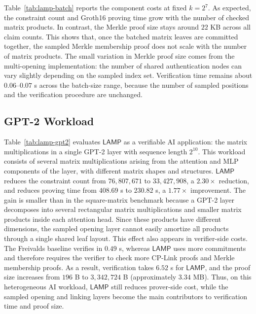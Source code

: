 \documentclass[conference,compsoc]{IEEEtran}
\newcommand{\protocol}{\textsf{LAMP}}   %
\theoremstyle{plain}
\theoremstyle{definition}
\theoremstyle{remark}
\providecommand{\DIFaddtex}[1]{{\protect\color{DIFADD} \sf #1}} %
\providecommand{\DIFaddbegin}{} %
\providecommand{\DIFaddend}{} %
\providecommand{\DIFadd}[1]{\texorpdfstring{\DIFaddtex{#1}}{#1}} %
\providecommand{\DIFaddincludegraphics}[2][]{{\color{blue}\fbox{\DIFOincludegraphics[#1]{#2}}}} %
\DeclareRobustCommand{\DIFaddbegin}{\DIFOaddbegin \let\includegraphics\DIFaddincludegraphics} %
\DeclareRobustCommand{\DIFaddend}{\DIFOaddend \let\includegraphics\DIFOincludegraphics} %
\begin{document}
Table~\ref{tab:lamp-batch} reports the component costs at fixed \(k=2^7\).
As expected, the constraint count and Groth16 proving time grow with the number
of checked matrix products.  In contrast, the Merkle proof size stays around
\(22\) KB across all claim counts.  This shows that, once the batched matrix
leaves are committed together, the sampled Merkle membership proof does not
scale with the number of matrix products.  The small variation in Merkle proof
size comes from the multi-opening implementation: the number of shared
authentication nodes can vary slightly depending on the sampled index set.
Verification time remains about \(0.06\)--\(0.07\) s across the batch-size
range, because the number of sampled positions and the verification procedure
are unchanged.

\subsection{GPT-2 Workload}
\label{sec:eval-gpt2}

Table~\ref{tab:lamp-gpt2} evaluates \(\protocol\) as a verifiable AI
application: the matrix multiplications in a single GPT-2 layer with sequence
length \(2^{10}\).  This workload consists of several matrix multiplications
arising from the attention and MLP components of the layer, with different
matrix shapes and structures.
\(\protocol\) reduces the constraint count from \(76{,}807{,}671\) to
\(33{,}427{,}908\), a \(2.30\times\) reduction, and reduces proving time from
\(408.69\) s to \(230.82\) s, a \(1.77\times\) improvement.  The gain is smaller
than in the square-matrix benchmark because a GPT-2 layer decomposes into
several rectangular matrix multiplications and smaller matrix products inside
each attention head.  Since these products have different dimensions, the
sampled opening layer cannot easily amortize all products through a single
shared leaf layout.
This effect also appears in verifier-side costs.  The Freivalds baseline
verifies in \(0.49\) s, whereas \(\protocol\) uses more commitments and therefore
requires the verifier to check more CP-Link proofs and Merkle membership proofs.
As a result, verification takes \(6.52\) s for \(\protocol\), and the proof size
increases \DIFaddbegin \DIFadd{from \(196\) B }\DIFaddend to \(3{,}342{,}724\) B \DIFaddbegin \DIFadd{(approximately \(3.34\) MB)}\DIFaddend .
Thus, on this heterogeneous AI workload,
\(\protocol\) still reduces prover-side cost, while the sampled opening and
linking layers become the main contributors to verification time and proof size.
\end{document}
